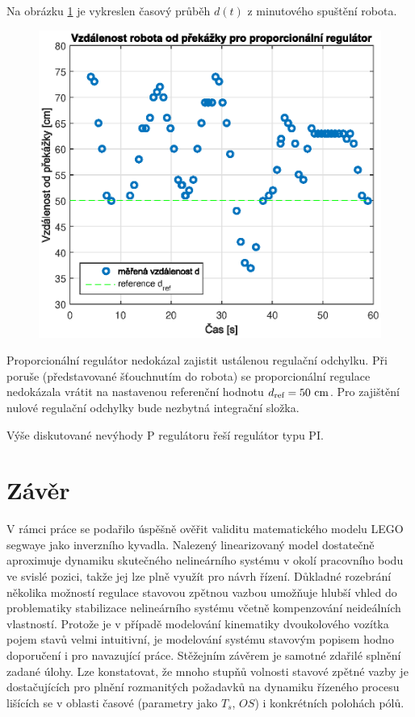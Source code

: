 \documentclass[conference]{IEEEtran}
\begin{document}
Na obrázku \ref{fig:vzdalenost_P} je vykreslen časový průběh $d(t)$ z minutového spuštění robota.
\begin{figure}[htbp]
    \centerline{\includegraphics[width=\linewidth]{vzdalenost_od_prekazky_proporcionalni.eps}}
    \caption{}
    \label{fig:vzdalenost_P}        
\end{figure}
Proporcionální regulátor nedokázal zajistit ustálenou regulační odchylku. Při poruše (představované šťouchnutím do robota)
se proporcionální regulace nedokázala vrátit na nastavenou referenční hodnotu $d_\text{ref} = 50~\text{\si{\centi\metre}}$.
Pro zajištění nulové regulační odchylky bude nezbytná integrační složka.


Výše diskutované nevýhody P regulátoru řeší regulátor typu PI.  

\section{Závěr}
V rámci práce se podařilo úspěšně ověřit validitu matematického modelu LEGO segwaye jako inverzního kyvadla.
Nalezený linearizovaný model dostatečně aproximuje dynamiku skutečného nelineárního systému v okolí pracovního bodu ve svislé pozici,
takže jej lze plně využít pro návrh řízení. Důkladné rozebrání několika možností regulace stavovou zpětnou vazbou umožňuje
hlubší vhled do problematiky stabilizace nelineárního systému včetně kompenzování neideálních vlastností.
Protože je v případě modelování kinematiky dvoukolového vozítka pojem stavů velmi intuitivní, je modelování systému stavovým popisem
hodno doporučení i pro navazující práce.  Stěžejním závěrem je samotné zdařilé splnění zadané úlohy.
Lze konstatovat, že mnoho stupňů volnosti stavové zpětné vazby je dostačujících pro plnění rozmanitých požadavků na dynamiku řízeného procesu
lišících se v oblasti časové (parametry jako $T_s$, $OS$) i konkrétních polohách pólů.
\end{document}
